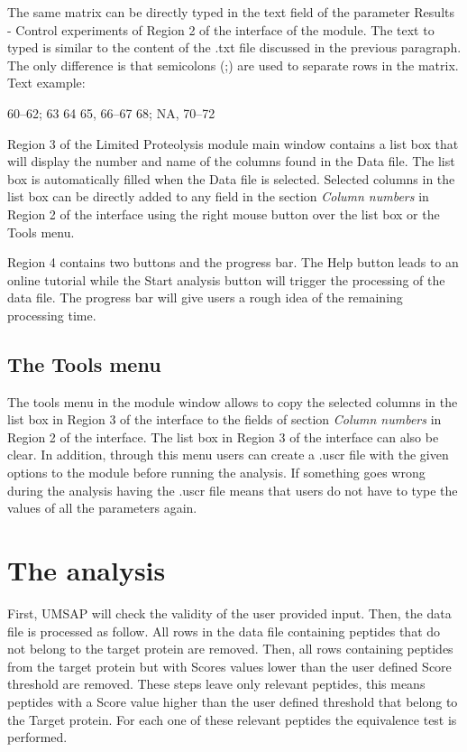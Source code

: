The same matrix can be directly typed in the text field of the parameter Results - Control experiments of Region \num{2} of the interface of the module. The text to typed is similar to the content of the .txt file discussed in the previous paragraph. The only difference is that semicolons (;) are used to separate rows in the matrix. Text example:

\numrange[range-phrase=--]{60}{62}; \num{63} \num{64} \num{65}, \numrange[range-phrase=--]{66}{67} \num{68}; NA, \numrange[range-phrase=--]{70}{72}

Region \num{3} of the Limited Proteolysis module main window contains a list box that will display the number and name of the columns found in the Data file. The list box is automatically filled when the Data file is selected. Selected columns in the list box can be directly added to any field in the section \textit{Column numbers} in Region \num{2} of the interface using the right mouse button over the list box or the Tools menu.

Region \num{4} contains two buttons and the progress bar. The Help button leads to an online tutorial while the Start analysis button will trigger the processing of the data file. The progress bar will give users a rough idea of the remaining processing time.

\subsection{The Tools menu}

The tools menu in the module window allows to copy the selected columns in the list box in Region \num{3} of the interface to the fields of section \textit{Column numbers} in Region \num{2} of the interface. The list box in Region \num{3} of the interface can also be clear. In addition, through this menu users can create a .uscr file with the given options to the module before running the analysis. If something goes wrong during the analysis having the .uscr file means that users do not have to type the values of all the parameters again.   

\section{The analysis}
\label{sec:limprotEquivalenceTest}
First, UMSAP will check the validity of the user provided input. Then, the data file is processed as follow. All rows in the data file containing peptides that do not belong to the target protein are removed. Then, all rows containing peptides from the target protein but with Scores values lower than the user defined Score threshold are removed. These steps leave only relevant peptides, this means peptides with a Score value higher than the user defined threshold that belong to the Target protein. For each one of these relevant peptides the equivalence test is performed\cite{Limentani2005}.


